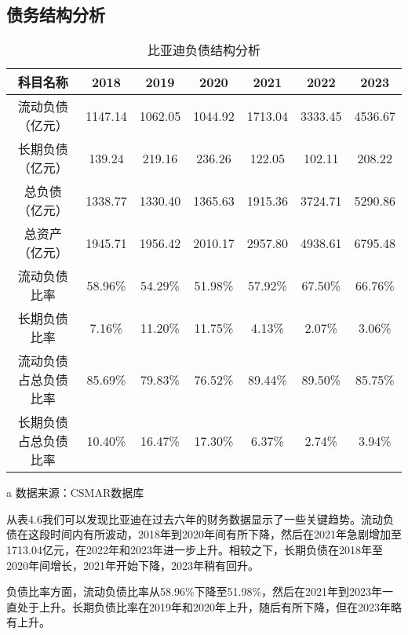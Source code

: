 \subsection{债务结构分析}
\begin{table}
  \centering
  \begin{threeparttable}[c]
    \caption{比亚迪负债结构分析}
    \label{tab:debt-structure}
    \begin{tabular}{ccccccc}
      \toprule
        科目名称 & 2018 & 2019 & 2020 & 2021 & 2022 & 2023 \\
      \midrule
        流动负债（亿元） & 1147.14  & 1062.05  & 1044.92  & 1713.04  & 3333.45  & 4536.67  \\
        长期负债（亿元） & 139.24  & 219.16  & 236.26  & 122.05  & 102.11  & 208.22  \\
        总负债（亿元） & 1338.77  & 1330.40  & 1365.63  & 1915.36  & 3724.71  & 5290.86  \\
        总资产（亿元） & 1945.71  & 1956.42  & 2010.17  & 2957.80  & 4938.61  & 6795.48  \\
        流动负债比率 & 58.96\% & 54.29\% & 51.98\% & 57.92\% & 67.50\% & 66.76\% \\
        长期负债比率 & 7.16\% & 11.20\% & 11.75\% & 4.13\% & 2.07\% & 3.06\% \\
        流动负债占总负债比率 & 85.69\% & 79.83\% & 76.52\% & 89.44\% & 89.50\% & 85.75\% \\
        长期负债占总负债比率 & 10.40\% & 16.47\% & 17.30\% & 6.37\% & 2.74\% & 3.94\% \\
      \bottomrule
    \end{tabular}
    \begin{tablenotes}
      \item [a] 数据来源：CSMAR数据库
    \end{tablenotes}
  \end{threeparttable}
\end{table}
从表4.6我们可以发现比亚迪在过去六年的财务数据显示了一些关键趋势。流动负债在这段时间内有所波动，2018年到2020年间有所下降，然后在2021年急剧增加至1713.04亿元，在2022年和2023年进一步上升。相较之下，长期负债在2018年至2020年间增长，2021年开始下降，2023年稍有回升。

负债比率方面，流动负债比率从58.96\%下降至51.98\%，然后在2021年到2023年一直处于上升。长期负债比率在2019年和2020年上升，随后有所下降，但在2023年略有上升。


